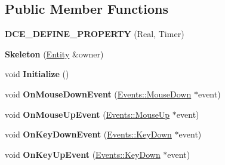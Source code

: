 \subsection*{Public Member Functions}
\begin{DoxyCompactItemize}
\item 
\hypertarget{classDCEngine_1_1Components_1_1Skeleton_a4a6b1f266f19a5c3b67187a5a11f779c}{{\bfseries D\-C\-E\-\_\-\-D\-E\-F\-I\-N\-E\-\_\-\-P\-R\-O\-P\-E\-R\-T\-Y} (Real, Timer)}\label{classDCEngine_1_1Components_1_1Skeleton_a4a6b1f266f19a5c3b67187a5a11f779c}

\item 
\hypertarget{classDCEngine_1_1Components_1_1Skeleton_a565c74386f4d54fe24a24d216f9943fc}{{\bfseries Skeleton} (\hyperlink{classDCEngine_1_1Entity}{Entity} \&owner)}\label{classDCEngine_1_1Components_1_1Skeleton_a565c74386f4d54fe24a24d216f9943fc}

\item 
\hypertarget{classDCEngine_1_1Components_1_1Skeleton_a8acabd6a55d57842cc2fefe2592ec589}{void {\bfseries Initialize} ()}\label{classDCEngine_1_1Components_1_1Skeleton_a8acabd6a55d57842cc2fefe2592ec589}

\item 
\hypertarget{classDCEngine_1_1Components_1_1Skeleton_a486c3cbbedfc944e61a0f624a43cec29}{void {\bfseries On\-Mouse\-Down\-Event} (\hyperlink{classDCEngine_1_1Events_1_1MouseDown}{Events\-::\-Mouse\-Down} $\ast$event)}\label{classDCEngine_1_1Components_1_1Skeleton_a486c3cbbedfc944e61a0f624a43cec29}

\item 
\hypertarget{classDCEngine_1_1Components_1_1Skeleton_acf6e90fa80a4693cfe6845b9b409e0f8}{void {\bfseries On\-Mouse\-Up\-Event} (\hyperlink{classDCEngine_1_1Events_1_1MouseUp}{Events\-::\-Mouse\-Up} $\ast$event)}\label{classDCEngine_1_1Components_1_1Skeleton_acf6e90fa80a4693cfe6845b9b409e0f8}

\item 
\hypertarget{classDCEngine_1_1Components_1_1Skeleton_ad4af37cb70bf09ca47a646392f9d9cab}{void {\bfseries On\-Key\-Down\-Event} (\hyperlink{classDCEngine_1_1Events_1_1KeyDown}{Events\-::\-Key\-Down} $\ast$event)}\label{classDCEngine_1_1Components_1_1Skeleton_ad4af37cb70bf09ca47a646392f9d9cab}

\item 
\hypertarget{classDCEngine_1_1Components_1_1Skeleton_a401b4b995d58fd64f5158a3881cf8fd0}{void {\bfseries On\-Key\-Up\-Event} (\hyperlink{classDCEngine_1_1Events_1_1KeyDown}{Events\-::\-Key\-Down} $\ast$event)}\label{classDCEngine_1_1Components_1_1Skeleton_a401b4b995d58fd64f5158a3881cf8fd0}


\end{DoxyCompactItemize}
